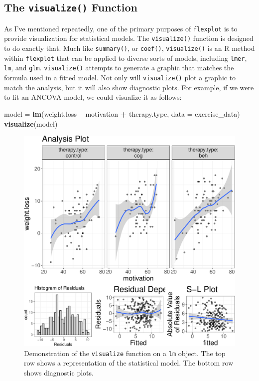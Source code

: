 \documentclass[
  man]{apa6}
\newenvironment{Shaded}{\begin{snugshade}}{\end{snugshade}}
\newcommand{\DataTypeTok}[1]{\textcolor[rgb]{0.13,0.29,0.53}{#1}}
\newcommand{\KeywordTok}[1]{\textcolor[rgb]{0.13,0.29,0.53}{\textbf{#1}}}
\newcommand{\NormalTok}[1]{#1}
\newcommand{\OperatorTok}[1]{\textcolor[rgb]{0.81,0.36,0.00}{\textbf{#1}}}
\newcommand{\StringTok}[1]{\textcolor[rgb]{0.31,0.60,0.02}{#1}}
\begin{document}
\hypertarget{the-visualize-function}{%
\subsection{\texorpdfstring{The \texttt{visualize()} Function}{The visualize() Function}}\label{the-visualize-function}}

As I've mentioned repeatedly, one of the primary purposes of \texttt{flexplot} is to provide visualization for statistical models. The \texttt{visualize()} function is designed to do exactly that. Much like \texttt{summary()}, or \texttt{coef()}, \texttt{visualize()} is an R method within \texttt{flexplot} that can be applied to diverse sorts of models, including \texttt{lmer}, \texttt{lm}, and \texttt{glm}. \texttt{visualize()} attempts to generate a graphic that matches the formula used in a fitted model. Not only will \texttt{visualize()} plot a graphic to match the analysis, but it will also show diagnostic plots. For example, if we were to fit an ANCOVA model, we could visualize it as follows:

\begin{Shaded}
\begin{Highlighting}[]
\NormalTok{model =}\StringTok{ }\KeywordTok{lm}\NormalTok{(weight.loss }\OperatorTok{~}\StringTok{ }\NormalTok{motivation }\OperatorTok{+}\StringTok{ }\NormalTok{therapy.type, }
           \DataTypeTok{data =}\NormalTok{ exercise_data)}
\KeywordTok{visualize}\NormalTok{(model)}
\end{Highlighting}
\end{Shaded}

\begin{figure}
\centering
\includegraphics{flexplot_psychmeth_files/figure-latex/ancova-1.pdf}
\caption{\label{fig:ancova}Demonstration of the \texttt{visualize} function on a \texttt{lm} object. The top row shows a representation of the statistical model. The bottom row shows diagnostic plots. \label{fig:ancova}}
\end{figure}
\end{document}
